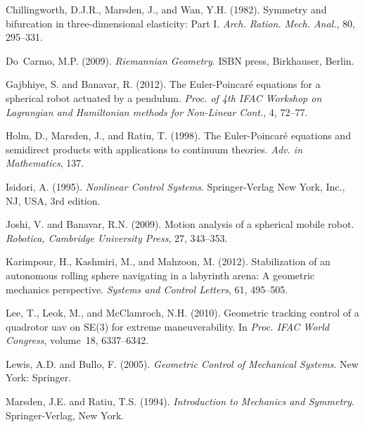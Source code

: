 \documentclass{ifacconf}
\begin{document}
\begin{thebibliography}{26}
Chillingworth, D.J.R., Marsden, J., and Wan, Y.H. (1982).
\newblock Symmetry and bifurcation in three-dimensional elasticity: {P}art {I}.
\newblock \emph{{A}rch. {R}ation. {M}ech. {A}nal.}, 80, 295--331.

Do~Carmo, M.P. (2009).
\newblock \emph{Riemannian Geometry}.
\newblock ISBN press, Birkhauser, Berlin.

Gajbhiye, S. and Banavar, R. (2012).
\newblock The {E}uler-{P}oincar\'{e} equations for a spherical robot actuated
  by a pendulum.
\newblock \emph{Proc. of 4th IFAC Workshop on Lagrangian and Hamiltonian
  methods for Non-Linear Cont.}, 4, 72--77.

Holm, D., Marsden, J., and Ratiu, T. (1998).
\newblock The {E}uler-{P}oincar\'{e} equations and semidirect products with
  applications to continuum theories.
\newblock \emph{Adv. in Mathematics}, 137.

Isidori, A. (1995).
\newblock \emph{Nonlinear Control Systems}.
\newblock Springer-Verlag New York, Inc., NJ, USA, 3rd edition.

Joshi, V. and Banavar, R.N. (2009).
\newblock Motion analysis of a spherical mobile robot.
\newblock \emph{Robotica, Cambridge University Press}, 27, 343--353.

Karimpour, H., Kashmiri, M., and Mahzoon, M. (2012).
\newblock Stabilization of an autonomous rolling sphere navigating in a
  labyrinth arena: A geometric mechanics perspective.
\newblock \emph{Systems and Control Letters}, 61, 495--505.

Lee, T., Leok, M., and McClamroch, N.H. (2010).
\newblock Geometric tracking control of a quadrotor uav on {SE}(3) for extreme
  maneuverability.
\newblock In \emph{Proc. IFAC World Congress}, volume~18, 6337--6342.

Lewis, A.D. and Bullo, F. (2005).
\newblock \emph{Geometric Control of Mechanical Systems}.
\newblock New York: Springer.

Marsden, J.E. and Ratiu, T.S. (1994).
\newblock \emph{Introduction to Mechanics and Symmetry}.
\newblock Springer-Verlag, New York.


\end{thebibliography}
\end{document}

